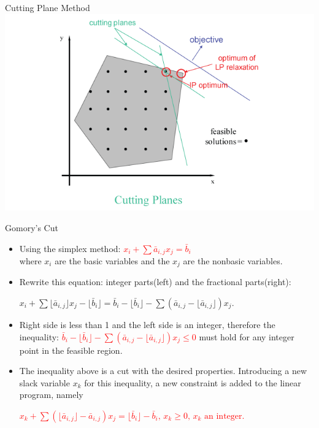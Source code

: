     \begin{frame}{Cutting Plane Method}
      \centering
      \includegraphics[width = 1\textwidth]{images/CP.png}
    \end{frame}

    \begin{frame}{Gomory's Cut}
      \begin{itemize}

      \item Using the simplex method:
      \textcolor{red}{$x_{i}+\sum{\bar {a}}_{i,j}x_{j}={\bar {b}}_{i}$} \\

      where $x_i$ are the basic variables and the $x_j$ are the nonbasic variables.

      \item Rewrite this equation: integer parts(left) and the fractional parts(right):

      $x_{i}+\sum \lfloor {\bar {a}}_{i,j}\rfloor x_{j}-\lfloor {\bar {b}}_{i}\rfloor ={\bar {b}}_{i}-\lfloor {\bar {b}}_{i}\rfloor -\sum ({\bar {a}}_{i,j}-\lfloor {\bar {a}}_{i,j}\rfloor )x_{j}.$ \\

      \item Right side is less than 1 and the left side is an integer, therefore the inequality:
      \textcolor{red}{${\bar {b}}_{i}-\lfloor {\bar {b}}_{i}\rfloor -\sum ({\bar {a}}_{i,j}-\lfloor {\bar {a}}_{i,j}\rfloor )x_{j}\leq 0 $}
      must hold for any integer point in the feasible region.

      \item The inequality above is a cut with the desired properties. Introducing a new slack variable $x_k$ for this inequality, a new constraint is added to the linear program, namely

      \textcolor{red}{$x_{k}+\sum (\lfloor {\bar {a}}_{i,j}\rfloor -{\bar {a}}_{i,j})x_{j}=\lfloor {\bar {b}}_{i}\rfloor -{\bar {b}}_{i},\,x_{k}\geq 0,\,x_{k}{\mbox{ an integer}}$.}
      \end{itemize}
    \end{frame}

